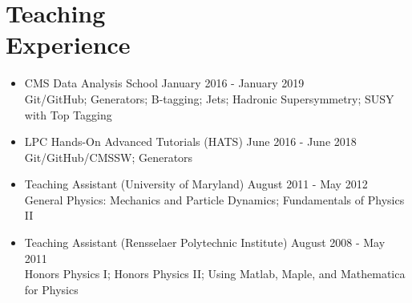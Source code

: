 \section{Teaching\\Experience}
\begin{itemize}[leftmargin=12pt]
\item CMS Data Analysis School \hfill January 2016 - January 2019\\
Git/GitHub; Generators; B-tagging; Jets; Hadronic Supersymmetry; SUSY with Top Tagging
\item LPC Hands-On Advanced Tutorials (HATS) \hfill June 2016 - June 2018\\
Git/GitHub/CMSSW; Generators
\item Teaching Assistant (University of Maryland) \hfill August 2011 - May 2012\\
General Physics: Mechanics and Particle Dynamics; Fundamentals of Physics II
\item Teaching Assistant (Rensselaer Polytechnic Institute) \hfill August 2008 - May 2011\\
Honors Physics I; Honors Physics II; Using Matlab, Maple, and Mathematica for Physics
\end{itemize}